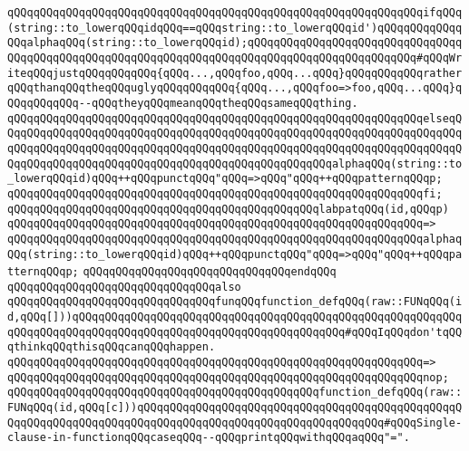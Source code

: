 \verb|qQQqqQQqqQQqqQQqqQQqqQQqqQQqqQQqqQQqqQQqqQQqqQQqqQQqqQQqqQQqqQQqifqQQq(string::to_lowerqQQqidqQQq==qQQqstring::to_lowerqQQqid')qQQqqQQqqQQqqQQqalphaqQQq(string::to_lowerqQQqid);qQQqqQQqqQQqqQQqqQQqqQQqqQQqqQQqqQQqqQQqqQQqqQQqqQQqqQQqqQQqqQQqqQQqqQQqqQQqqQQqqQQqqQQqqQQqqQQq#qQQqWriteqQQqjustqQQqqQQqqQQq{qQQq...,qQQqfoo,qQQq...qQQq}qQQqqQQqqQQqratherqQQqthanqQQqtheqQQquglyqQQqqQQqqQQq{qQQq...,qQQqfoo=>foo,qQQq...qQQq}qQQqqQQqqQQq--qQQqtheyqQQqmeanqQQqtheqQQqsameqQQqthing.|\newline
\verb|qQQqqQQqqQQqqQQqqQQqqQQqqQQqqQQqqQQqqQQqqQQqqQQqqQQqqQQqqQQqqQQqelseqQQqqQQqqQQqqQQqqQQqqQQqqQQqqQQqqQQqqQQqqQQqqQQqqQQqqQQqqQQqqQQqqQQqqQQqqQQqqQQqqQQqqQQqqQQqqQQqqQQqqQQqqQQqqQQqqQQqqQQqqQQqqQQqqQQqqQQqqQQqqQQqqQQqqQQqqQQqqQQqqQQqqQQqqQQqqQQqqQQqqQQqqQQqqQQqalphaqQQq(string::to_lowerqQQqid)qQQq++qQQqpunctqQQq"qQQq=>qQQq"qQQq++qQQqpatternqQQqp;|\newline
\verb|qQQqqQQqqQQqqQQqqQQqqQQqqQQqqQQqqQQqqQQqqQQqqQQqqQQqqQQqqQQqqQQqfi;|\newline
\newline
\verb|qQQqqQQqqQQqqQQqqQQqqQQqqQQqqQQqqQQqqQQqqQQqqQQqlabpatqQQq(id,qQQqp)|\newline
\verb|qQQqqQQqqQQqqQQqqQQqqQQqqQQqqQQqqQQqqQQqqQQqqQQqqQQqqQQqqQQqqQQq=>|\newline
\verb|qQQqqQQqqQQqqQQqqQQqqQQqqQQqqQQqqQQqqQQqqQQqqQQqqQQqqQQqqQQqqQQqalphaqQQq(string::to_lowerqQQqid)qQQq++qQQqpunctqQQq"qQQq=>qQQq"qQQq++qQQqpatternqQQqp;|\newline
\verb|qQQqqQQqqQQqqQQqqQQqqQQqqQQqqQQqendqQQq|\newline
\newline
\verb|qQQqqQQqqQQqqQQqqQQqqQQqqQQqqQQqalso|\newline
\verb|qQQqqQQqqQQqqQQqqQQqqQQqqQQqqQQqfunqQQqfunction_defqQQq(raw::FUNqQQq(id,qQQq[]))qQQqqQQqqQQqqQQqqQQqqQQqqQQqqQQqqQQqqQQqqQQqqQQqqQQqqQQqqQQqqQQqqQQqqQQqqQQqqQQqqQQqqQQqqQQqqQQqqQQqqQQqqQQqqQQq#qQQqIqQQqdon'tqQQqthinkqQQqthisqQQqcanqQQqhappen.|\newline
\verb|qQQqqQQqqQQqqQQqqQQqqQQqqQQqqQQqqQQqqQQqqQQqqQQqqQQqqQQqqQQqqQQq=>|\newline
\verb|qQQqqQQqqQQqqQQqqQQqqQQqqQQqqQQqqQQqqQQqqQQqqQQqqQQqqQQqqQQqqQQqnop;|\newline
\newline
\verb|qQQqqQQqqQQqqQQqqQQqqQQqqQQqqQQqqQQqqQQqqQQqqQQqfunction_defqQQq(raw::FUNqQQq(id,qQQq[c]))qQQqqQQqqQQqqQQqqQQqqQQqqQQqqQQqqQQqqQQqqQQqqQQqqQQqqQQqqQQqqQQqqQQqqQQqqQQqqQQqqQQqqQQqqQQqqQQqqQQqqQQqqQQq#qQQqSingle-clause-in-functionqQQqcaseqQQq--qQQqprintqQQqwithqQQqaqQQq"=".|\newline
